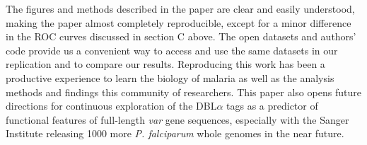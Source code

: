 \documentclass[10pt,twocolumn,superscriptaddress]{revtex4-1}
\newcommand{\var}{{\it var}\xspace}
\newcommand{\pf}{{\it P. falciparum}\xspace}
\newcommand{\dbla}{{DBL$\alpha$}\xspace}
\begin{document}
The figures and methods described in the paper are clear and easily understood, making the paper almost completely reproducible, except for a minor difference in the ROC curves discussed in section C above. The open datasets and authors' code provide us a convenient way to access and use the same datasets in our replication and to compare our results. Reproducing this work has been a productive experience to learn the biology of malaria as well as the analysis methods and findings this community of researchers. This paper also opens future directions for continuous exploration of the \dbla tags as a predictor of functional features of full-length \var gene sequences, especially with the Sanger Institute releasing 1000 more \pf whole genomes in the near future. 

%


\nocite{*}

 
\end{document}
